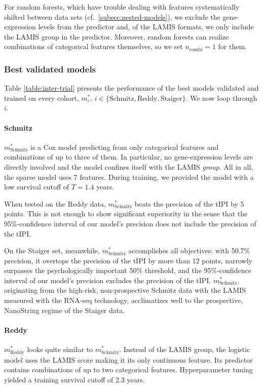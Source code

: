 For random forests, which have trouble dealing with features systematically shifted between data 
sets (cf.\ \ref{subsec:nested-models}), we exclude the gene-expression levels from the predictor 
and, of the LAMIS formats, we only include the LAMIS group in the predictor. Moreover, random 
forests can realize combinations of categorical features themselves, so we set $n_\text{combi} = 1$ 
for them.

\subsubsection{Best validated models}

Table \ref{table:inter-trial} presents the performance of the best models validated and trained on 
every cohort, $m_i^*$, $i \in \{ \text{Schmitz}, \text{Reddy}, \text{Staiger} \}$. We now loop 
through $i$.



\paragraph{Schmitz}
$m^*_\text{Schmitz}$ is a Cox model predicting from only categorical features and combinations of up to 
three of them. In particular, no gene-expression levels are directly involved and the model confines 
itself with the LAMIS \textit{group}. All in all, the sparse model uses \num{7} features. During 
training, we provided the model with a low survival cutoff of $T = \num{1.4}$ years.

When tested on the Reddy data, $m^*_\text{Schmitz}$ beats the precision of the tIPI by 5 points. This 
is not enough to show significant superiority in the sense that the \num{95}\%-confidence interval 
of our model's precision does not include the precision of the tIPI.

On the Staiger set, meanwhile, $m^*_\text{Schmitz}$ accomplishes all objectives: with 
\num{50.7}\% precision, it overtops the precision of the tIPI by more than 12 points, narrowly 
surpasses the 
psychologically important \num{50}\% threshold, and the \num{95}\%-confidence interval of our model's 
precision excludes the precision of the tIPI. $m^*_\text{Schmitz}$, originating from 
the high-risk, non-prospective Schmitz data with the LAMIS measured with the 
RNA-seq technology, acclimatizes well to the prospective, NanoString regime of the Staiger data. 

\paragraph{Reddy}
$m^*_\text{Reddy}$ looks quite similar to $m^*_\text{Schmitz}$. Instead of the LAMIS group, the 
logistic model uses the LAMIS score making it its only continuous feature. Its predictor contains 
combinations of up to two categorical features. Hyperparameter tuning yielded a training survival 
cutoff of \num{2.3} years. 

